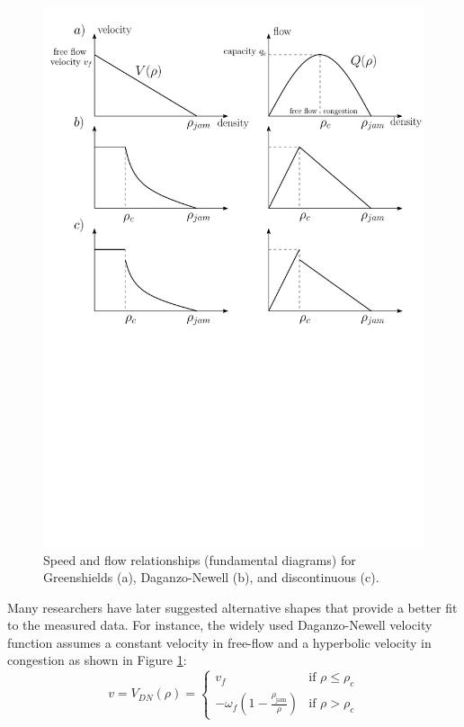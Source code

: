 \documentclass[11pt]{article}
\numberwithin{equation}{section}
\numberwithin{figure}{section}
\numberwithin{table}{section}
\begin{document}
\begin{figure}[ht]
  \centering
    \includegraphics[width=12cm]{fundamentalDiagram2.pdf}
    \caption{Speed and flow relationships (fundamental diagrams) for Greenshields (a), Daganzo-Newell (b), and discontinuous (c).}
    \label{fig:fundamentalDiagram}
\end{figure}

Many researchers have later suggested alternative shapes that provide a better fit to the measured data. For instance, the widely used Daganzo-Newell velocity function assumes a constant velocity in free-flow and a hyperbolic velocity in congestion as shown in Figure \ref{fig:fundamentalDiagram}:
\noindent 
\begin{equation}\label{eq:dnVelocity}
v = V_{DN}(\rho) = \begin{cases}
v_{f} & \text{if } \rho \leq \rho_{c} \\
-\omega_{f} \left( 1 - \frac{\rho_{\text{jam}}}{\rho} \right) & \text{if } \rho > \rho_{c}
\end{cases}
\end{equation}
\end{document}
